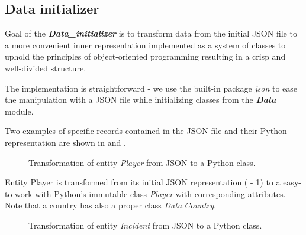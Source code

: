 \subsection{Data initializer}\label{subsection: di}
Goal of the \textbf{\textit{Data\_initializer}} is to transform data from the initial JSON file to a more convenient inner representation implemented as a system of classes to uphold the principles of object-oriented programming resulting in a crisp and well-divided structure.

The implementation is straightforward - we use the built-in package \emph{json} to ease the manipulation with a JSON file while initializing classes from the \textbf{\textit{Data}} module. 

Two examples of specific records contained in the JSON file and their Python representation are shown in  and . 

\begin{figure}[h]
	\caption{Transformation of entity \emph{Player} from JSON to a Python class.}
	\label{fig:player}
\end{figure}

Entity {Player} is transformed from its initial JSON representation ( - 1) to a easy-to-work-with Python's immutable class \emph{Player} with corresponding attributes. Note that a country has also a proper class \emph{Data.Country}.

\begin{figure}[h]
	\caption{Transformation of entity \emph{Incident} from JSON to a Python class.}
	\label{fig:incident}
\end{figure} 

